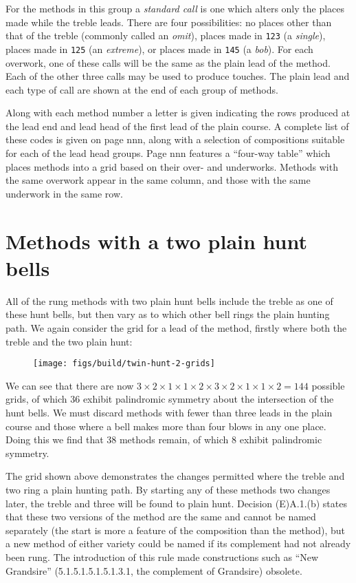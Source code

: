 For the methods in this group a \emph{standard call} is one which alters only
the places made while the treble leads.
There are four possibilities:
no places other than that of the treble (commonly called an \emph{omit}),
places made in {\tt 123} (a \emph{single}),
places made in {\tt 125} (an \emph{extreme}),
or places made in {\tt 145} (a \emph{bob}).
For each overwork,
one of these calls will be the same as the plain lead of the method.
Each of the other three calls may be used to produce touches.
The plain lead and each type of call are shown at the end of each group of
methods.

Along with each method number a letter is given indicating the rows produced at
the lead end and lead head of the first lead of the plain course.
A complete list of these codes is given on page nnn,
along with a selection of compositions suitable for each of the lead head
groups.
Page nnn features a “four-way table” which places methods into a grid based on
their over- and underworks.
Methods with the same overwork appear in the same column,
and those with the same underwork in the same row.

\section{Methods with a two plain hunt bells} \label{sec:intro-double-hunt}

All of the rung methods with two plain hunt bells include the treble as one of
these hunt bells,
but then vary as to which other bell rings the plain hunting path.
We again consider the grid for a lead of the method,
firstly where both the treble and the two plain hunt:

\begin{figure}[h]
  \centering
  \texttt{[image: figs/build/twin-hunt-2-grids]}
\end{figure}

We can see that there are now
\(3\times2\times1\times1\times2\times3\times2\times1\times1\times 2 = 144\)
possible grids, of which 36 exhibit palindromic symmetry about the intersection
of the hunt bells.
We must discard methods with fewer than three leads in the plain course and
those where a bell makes more than four blows in any one place.
Doing this we find that 38 methods remain,
of which 8 exhibit palindromic symmetry.

The grid shown above demonstrates the changes permitted where the treble and two
ring a plain hunting path.
By starting any of these methods two changes later,
the treble and three will be found to plain hunt.
Decision (E)A.1.(b) states that these two versions of the method are the same
and cannot be named separately
(the start is more a feature of the composition than the method),
but a new method of either variety could be named if its complement had not
already been rung.
The introduction of this rule made constructions such as ``New Grandsire''
(5.1.5.1.5.1.5.1.3.1, the complement of Grandsire) obsolete.

